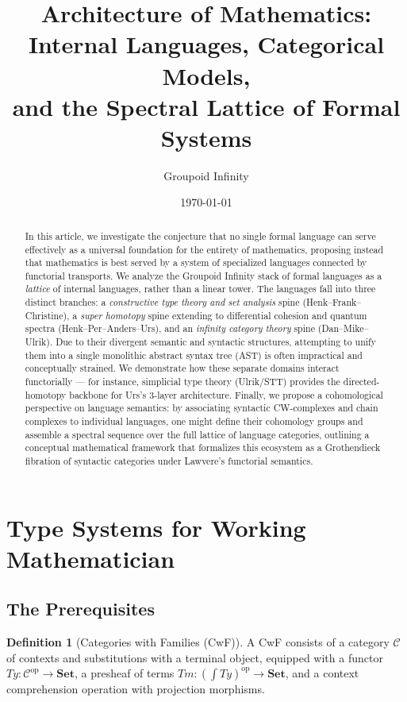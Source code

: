 \documentclass{article}
\title{Architecture of Mathematics:\\
Internal Languages, Categorical Models, \\
and the Spectral Lattice of Formal Systems}
\author{Groupoid Infinity}
\date{\today}
\theoremstyle{definition}
\newtheorem{definition}{Definition}[section]
\theoremstyle{plain}
\begin{document}
\maketitle

\begin{abstract}
In this article, we investigate the conjecture that no single formal language can serve effectively as a universal
foundation for the entirety of mathematics, proposing instead that mathematics is best served by a
system of specialized languages connected by functorial transports. We analyze the Groupoid Infinity
stack of formal languages as a \emph{lattice} of internal languages, rather than a linear tower.
The languages fall into three distinct branches: a \emph{constructive type theory and set analysis}
spine (Henk--Frank--Christine), a \emph{super homotopy} spine extending to differential cohesion
and quantum spectra (Henk--Per--Anders--Urs), and an \emph{infinity category theory} spine (Dan--Mike--Ulrik).
Due to their divergent semantic and syntactic structures, attempting to unify them into a single monolithic
abstract syntax tree (AST) is often impractical and conceptually strained. We demonstrate how these separate
domains interact functorially --- for instance, simplicial type theory (Ulrik/STT) provides the
directed-homotopy backbone for Urs's 3-layer architecture. Finally, we propose a cohomological perspective
on language semantics: by associating syntactic CW-complexes and chain complexes to individual languages,
one might define their cohomology groups and assemble a spectral sequence over the full lattice
of language categories, outlining a conceptual mathematical framework that formalizes this ecosystem as a
Grothendieck fibration of syntactic categories under Lawvere's functorial semantics.
\end{abstract}

\newpage
\tableofcontents
\newpage

\section{Type Systems for Working Mathematician}

\subsection{The Prerequisites}

\begin{definition}[Categories with Families (CwF)]
A CwF consists of a category $\mathcal{C}$ of contexts and substitutions with a terminal object, equipped with a functor $Ty : \mathcal{C}^{\mathrm{op}} \to \mathbf{Set}$, a presheaf of terms $Tm : (\int Ty)^{\mathrm{op}} \to \mathbf{Set}$, and a context comprehension operation with projection morphisms.
\end{definition}
\end{document}
